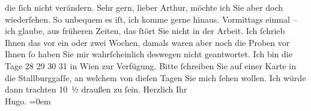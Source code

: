 \begin{ledgroupsized}[t]{13cm}
               die ſich nicht verändern.\pend
           \pstart
           Sehr gern, lieber Arthur, möchte ich Sie aber doch wiederſehen. So unbequem es iſt,
               ich komme gerne {\pb}hinaus.
               Vormittags einmal – ich glaube, aus früheren Zeiten, das ſtört Sie nicht in der
               Arbeit.\pend
           \pstart
           Ich ſchrieb Ihnen das vor ein oder zwei Wochen, damals waren aber noch die Proben vor Ihnen ſo haben Sie mir
               wahrſcheinlich deswegen nicht geantwortet.\pend
           \pstart
           Ich bin die Tage 28{ }29{ }30{ }31 in Wien zur Verfügung. Bitte
               ſchreiben {\pb}Sie auf einer Karte in
               die Stallburggaſſe, an welchem von dieſen Tagen
               Sie mich ſehen wollen.\pend
           \pstart
           Ich würde dann trachten 10 ½ draußen zu ſein.\pend
           \pstart
           Herzlich Ihr{\\[\baselineskip]}\spacefill\mbox{Hugo.}\pend
           \leftskip=0em{}\endnumbering{}\end{ledgroupsized}  \newcommand{\dateiname}{L02317}\newcommand{\titel}{Hugo von Hofmannsthal an Arthur Schnitzler, 21. 12. [1918?]}\newcommand{\editorInnen}{Martin Anton Müller und Gerd-Hermann Susen}
      